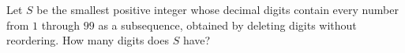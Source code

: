 Let $S$ be the smallest positive integer whose decimal digits contain every number from $1$ through $99$ as a subsequence, obtained by deleting digits without reordering. How many digits does $S$ have?
